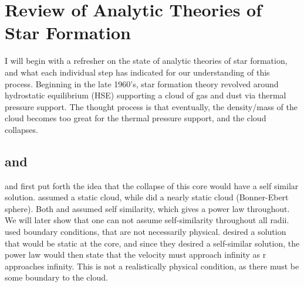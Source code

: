 \documentclass[../dissertation.tex]{subfiles}
\begin{document}
\section{Review of Analytic Theories of Star Formation} \label{sec:sf_review}
I will begin with a refresher on the state of analytic theories of star formation, and what each individual step has indicated for our understanding of this process.
Beginning in the late 1960's, star formation theory revolved around hydrostatic equilibrium (HSE) supporting a cloud of gas and dust via thermal pressure support. 
The thought process is that eventually, the density/mass of the cloud becomes too great for the thermal pressure support, and the cloud collapses.

\subsection{\citet{1969MNRAS.145..271L} and \citet{1969MNRAS.144..425P}}
\citet{1969MNRAS.145..271L} and \citet{1969MNRAS.144..425P} first put forth the idea that the collapse of this core would have a self similar solution.
\citet{1969MNRAS.145..271L} assumed a static cloud, while \citet{1969MNRAS.144..425P} did a nearly static cloud (Bonner-Ebert sphere). 
Both \citet{1969MNRAS.145..271L} and \citet{1969MNRAS.144..425P} assumed self similarity, which gives a power law throughout. 
We will later show that one can not assume self-similarity throughout all radii. 
\citet{1969MNRAS.145..271L} used boundary conditions, that are not necessarily physical. 
\citet{1969MNRAS.145..271L} desired a solution that would be static at the core, and since they desired a self-similar solution, 
the power law would then state that the velocity must approach infinity as r approaches infinity. 
This is not a realistically physical condition, as there must be some boundary to the cloud.
\end{document}
